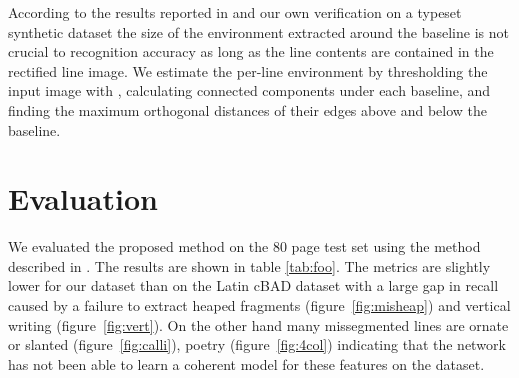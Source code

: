 According to the results reported in \cite{romero2015influence} and our own
verification on a typeset synthetic dataset the size of the environment
extracted around the baseline is not crucial to recognition accuracy as long as
the line contents are contained in the rectified line image. We estimate the
per-line environment by thresholding the input image with
\cite{sauvola2000adaptive}, calculating connected components under each
baseline, and finding the maximum orthogonal distances of their edges above and
below the baseline.



\section{Evaluation}

We evaluated the proposed method on the 80 page test set using the method
described in \cite{gruning2018read}. The results are shown in table
\ref{tab:foo}. The metrics are slightly lower for our dataset than on the Latin
cBAD dataset with a large gap in recall caused by a failure to extract heaped
fragments (figure~\ref{fig:misheap}) and vertical writing (figure~\ref{fig:vert}). On the other hand many missegmented lines are ornate or
slanted (figure~\ref{fig:calli}), poetry (figure~\ref{fig:4col}) indicating
that the network has not been able to learn a coherent model for these features
on the dataset.

